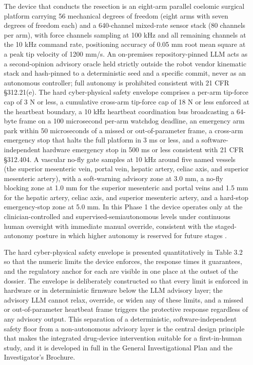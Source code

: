 The device that conducts the resection is an eight-arm parallel coelomic surgical
platform carrying 56 mechanical degrees of freedom (eight arms with seven
degrees of freedom each) and a 640-channel mixed-rate sensor stack (80 channels per
arm), with force channels sampling at 100 kHz and all remaining channels at the
10 kHz command rate, positioning accuracy of 0.05 mm root mean square at a peak tip
velocity of 1200 mm/s. An on-premises repository-pinned LLM acts as a second-opinion
advisory oracle held strictly outside the robot vendor kinematic stack and hash-pinned
to a deterministic seed and a specific commit, never as an autonomous controller;
full autonomy is prohibited consistent with 21 CFR \S 312.21(e). The hard
cyber-physical safety envelope comprises a per-arm tip-force cap of 3 N or less, a
cumulative cross-arm tip-force cap of 18 N or less enforced at the heartbeat
boundary, a 10 kHz heartbeat coordination bus broadcasting a 64-byte frame on a 100
microsecond per-arm watchdog deadline, an emergency arm park within 50 microseconds
of a missed or out-of-parameter frame, a cross-arm emergency stop that halts the
full platform in 3 ms or less, and a software-independent hardware emergency stop in
500 ms or less consistent with 21 CFR \S 312.404. A vascular no-fly gate samples at
10 kHz around five named vessels (the superior mesenteric vein, portal vein, hepatic
artery, celiac axis, and superior mesenteric artery), with a soft-warning advisory
zone at 3.0 mm, a no-fly blocking zone at 1.0 mm for the superior mesenteric and
portal veins and 1.5 mm for the hepatic artery, celiac axis, and superior mesenteric
artery, and a hard-stop emergency-stop zone at 5.0 mm. In this Phase 1 the device
operates only at the clinician-controlled and supervised-semiautonomous levels under
continuous human oversight with immediate manual override, consistent with the
staged-autonomy posture in which higher autonomy is reserved for future stages
\cite{daraxwhipple, onpremwhippl, clintrustpai}.

The hard cyber-physical safety envelope is presented quantitatively in Table 3.2 so
that the numeric limits the device enforces, the response times it guarantees, and
the regulatory anchor for each are visible in one place at the outset of the
dossier. The envelope is deliberately constructed so that every limit is enforced
in hardware or in deterministic firmware below the LLM advisory layer; the advisory
LLM cannot relax, override, or widen any of these limits, and a missed or
out-of-parameter heartbeat frame triggers the protective response regardless of any
advisory output. This separation of a deterministic, software-independent safety
floor from a non-autonomous advisory layer is the central design principle that
makes the integrated drug-device intervention suitable for a first-in-human study,
and it is developed in full in the General Investigational Plan and the
Investigator's Brochure.

